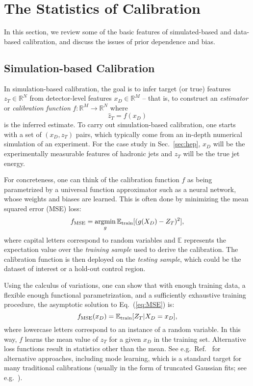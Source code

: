 \documentclass[aps,prd,reprint,preprintnumbers,superscriptaddress,nofootinbib,longbibliography,floatfix]{revtex4-1}
\DeclareMathOperator*{\argmin}{argmin}
\DeclareRobustCommand{\Sec}[1]{Sec.~\ref{sec:#1}}
\DeclareRobustCommand{\Eq}[1]{Eq.~(\ref{eq:#1})}
\DeclareRobustCommand{\Ref}[1]{Ref.~\cite{#1}}
\begin{document}
\section{The Statistics of Calibration}
\label{sec:statsofcalib}

In this section, we review some of the basic features of simulated-based and data-based calibration, and discuss the issues of prior dependence and bias.

\subsection{Simulation-based Calibration}

In simulation-based calibration, the goal is to infer target (or true) features $z_T\in\mathbb{R}^N$ from detector-level features $x_D\in\mathbb{R}^M$ -- that is, to construct an \emph{estimator} or \textit{calibration function} $f:\mathbb{R}^M\rightarrow\mathbb{R}^N$ where
%
\begin{equation}
\hat{z}_T = f(x_D)
\end{equation}
%
is the inferred estimate.
%
To carry out simulation-based calibration, one starts with a set of $(x_D,z_T)$ pairs, which typically come from an in-depth numerical simulation of an experiment.
%
For the case study in \Sec{hep}, $x_D$ will be the experimentally measurable features of hadronic jets and $z_T$ will be the true jet energy.


For concreteness, one can think of the calibration function $f$ as being parametrized by a universal function approximator such as a neural network, whose weights and biases are learned.
%
This is often done by minimizing the mean squared error (MSE) loss:
%
\begin{equation}
\label{eq:MSE}
f_{\rm MSE}=\argmin_{g}\mathbb{E}_{\text{train}}[(g(X_D)-Z_T)^2],
\end{equation}
%
where capital letters correspond to random variables and $\mathbb{E}$ represents the expectation value over the \emph{training sample} used to derive the calibration.
%
The calibration function is then deployed on the \emph{testing sample}, which could be the dataset of interest or a hold-out control region.


Using the calculus of variations, one can show that with enough training data, a flexible enough functional parametrization, and a sufficiently exhaustive training procedure, the asymptotic solution to \Eq{MSE} is:
%
\begin{equation}
\label{eq:MSE_sol}
f_{\rm MSE}(x_D)=\mathbb{E}_{\text{train}}[Z_T|X_D=x_D],
\end{equation}
%
where lowercase letters correspond to an instance of a random variable.
%
In this way, $f$ learns the mean value of $z_T$ for a given $x_D$ in the training set.
%
Alternative loss functions result in statistics other than the mean.
%
See e.g.\ \Ref{Cheong:2019upg} for alternative approaches, including mode learning, which is a standard target for many traditional calibrations (usually in the form of truncated Gaussian fits; see e.g.~\cite{CMS:2015xaf}). 
\end{document}
